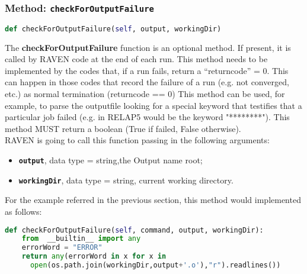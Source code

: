  \subsubsection{Method: \texttt{checkForOutputFailure}}
\label{subsubsec:checkForOutputFailure}
\begin{lstlisting}[language=python]
def checkForOutputFailure(self, output, workingDir)
\end{lstlisting}
The \textbf{checkForOutputFailure} function is an optional method. If present, it is called
by RAVEN code at the end of each run. This method needs to be implemented by the codes that, if a run fails, return a ``returncode'' = 0.
This can happen in those codes that record the failure of a run (e.g. not converged, etc.) as normal termination (returncode == 0)
This method can be used, for example, to parse the outputfile looking for a special keyword that testifies that a particular job  failed
 (e.g. in RELAP5 would be the keyword "********"). This method MUST return a boolean (True if failed, False otherwise).
\\RAVEN is going to call this function passing in the following arguments:
\begin{itemize}
  \item \textbf{\texttt{output}}, data type = string,the Output name root;
  \item  \textbf{\texttt{workingDir}}, data type = string, current working directory.
\end{itemize}
For the example referred in the previous section, this method would implemented as follows:
\newline
\begin{lstlisting}[language=python]
def checkForOutputFailure(self, command, output, workingDir):
    from  __builtin__ import any
    errorWord = "ERROR"
    return any(errorWord in x for x in
      open(os.path.join(workingDir,output+'.o'),"r").readlines())
 \end{lstlisting}

